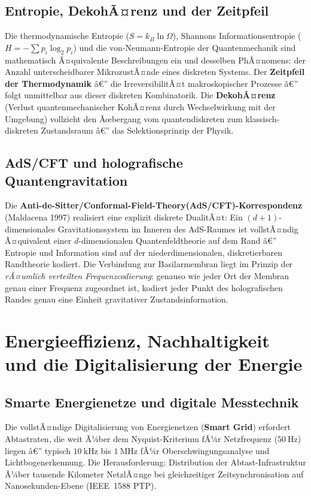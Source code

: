 ﻿\documentclass[12pt,a4paper,titlepage]{report}
\begin{document}
\subsection{Entropie, DekohÃ¤renz und der Zeitpfeil}

Die thermodynamische Entropie ($S = k_B \ln \Omega$), Shannons Informationsentropie
($H = -\sum p_i \log_2 p_i$) und die von-Neumann-Entropie der Quantenmechanik
sind mathematisch Ã¤quivalente Beschreibungen ein und desselben PhÃ¤nomens:
der Anzahl unterscheidbarer MikrozustÃ¤nde eines diskreten Systems.
Der \textbf{Zeitpfeil der Thermodynamik} â€” die IrreversibilitÃ¤t makroskopischer
Prozesse â€” folgt unmittelbar aus dieser diskreten Kombinatorik.
Die \textbf{DekohÃ¤renz} (Verlust quantenmechanischer KohÃ¤renz durch Wechselwirkung
mit der Umgebung) vollzieht den Ãœbergang vom quantendiskreten zum klassisch-diskreten
Zustandsraum â€” das Selektionsprinzip der Physik.

\subsection{AdS/CFT und holografische Quantengravitation}

Die \textbf{Anti-de-Sitter/Conformal-Field-Theory(AdS/CFT)-Korrespondenz} (Maldacena 1997)
realisiert eine explizit diskrete DualitÃ¤t: Ein $(d+1)$-dimensionales Gravitationssystem
im Inneren des AdS-Raumes ist vollstÃ¤ndig Ã¤quivalent einer $d$-dimensionalen
Quantenfeldtheorie auf dem Rand â€” Entropie und Information sind auf der
niederdimensionalen, diskretierbaren Randtheorie kodiert. Die Verbindung zur
Basilarmembran liegt im Prinzip der \emph{rÃ¤umlich verteilten Frequenzcodierung}:
genauso wie jeder Ort der Membran genau einer Frequenz zugeordnet ist,
kodiert jeder Punkt des holografischen Randes genau eine Einheit gravitativer
Zustandsinformation.

\section{Energieeffizienz, Nachhaltigkeit und die Digitalisierung der Energie}

\subsection{Smarte Energienetze und digitale Messtechnik}

Die vollstÃ¤ndige Digitalisierung von Energienetzen (\textbf{Smart Grid}) erfordert
Abtastraten, die weit Ã¼ber dem Nyquist-Kriterium fÃ¼r Netzfrequenz ($\SI{50}{\hertz}$)
liegen â€” typisch $\SI{10}{\kilo\hertz}$ bis $\SI{1}{\mega\hertz}$ fÃ¼r
Oberschwingungsanalyse und Lichtbogenerkennung. Die Herausforderung:
Distribution der Abtast-Infrastruktur Ã¼ber tausende Kilometer NetzlÃ¤nge bei
gleichzeitiger Zeitsynchronisation auf Nanosekunden-Ebene (IEEE~1588 PTP).
\end{document}
